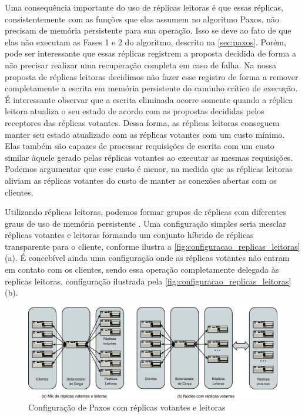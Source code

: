Uma consequência importante do uso de réplicas leitoras é que essas réplicas,
consistentemente com as funções que elas assumem no algoritmo Paxos, não precisam de
memória persistente para sua operação. Isso se deve ao fato de que elas não executam as
Fases 1 e 2 do algoritmo, descrito na \autoref{sec:paxos}. Porém, pode ser interessante
que essas réplicas registrem a proposta decidida de forma a não precisar realizar uma
recuperação completa em caso de falha. Na nossa proposta de réplicas leitoras decidimos
não fazer esse registro de forma a remover completamente a escrita em memória persistente
do caminho crítico de execução. É interessante observar que a escrita eliminada ocorre
somente quando a réplica leitora atualiza o seu estado de acordo com as propostas
decididas pelos receptores das réplicas votantes. Dessa forma, as réplicas leitoras
conseguem manter seu estado atualizado com as réplicas votantes com um custo mínimo. Elas
também são capazes de processar requisições de escrita com um custo similar àquele gerado
pelas réplicas votantes ao executar as mesmas requisições. Podemos argumentar que esse
custo é menor, na medida que as réplicas leitoras aliviam as réplicas votantes do custo de
manter as conexões abertas com os clientes.

Utilizando réplicas leitoras, podemos formar grupos de réplicas com diferentes graus de
uso de memória persistente \cite{aguilera00}. Uma configuração simples seria mesclar
réplicas votantes e leitoras formando um conjunto híbrido de réplicas transparente para o
cliente, conforme ilustra a \autoref{fig:configuracao_replicas_leitoras} (a). É concebível
ainda uma configuração onde as réplicas votantes não entram em contato com os clientes,
sendo essa operação completamente delegada às replicas leitoras, configuração ilustrada
pela \autoref{fig:configuracao_replicas_leitoras} (b).

\begin{figure}[ht]
  \begin{center}
    \includegraphics[width=16cm]{conteudo/capitulos/figuras/configuracao_replicas_leitoras.eps}
  \end{center}
  \caption{Configuração de Paxos com réplicas votantes e leitoras}
  \label{fig:configuracao_replicas_leitoras}
\end{figure}

